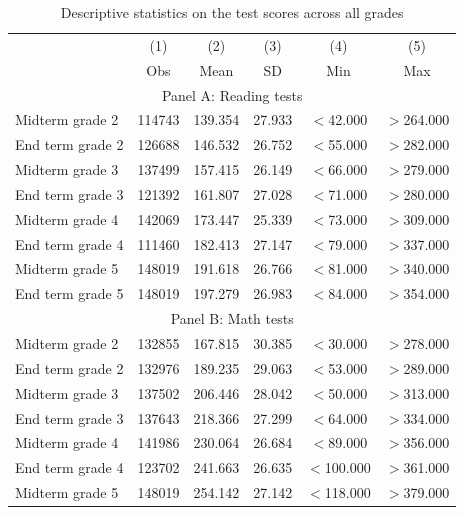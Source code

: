 \begin{table}[h!]
\begin{center}
\caption{Descriptive statistics on the test scores across all grades}
\label{tbl:descrstats_tests}
\begin{tabular}{lccccc}
\toprule \toprule
&\multicolumn{1}{c}{(1)}&\multicolumn{1}{c}{(2)}&\multicolumn{1}{c}{(3)}&\multicolumn{1}{c}{(4)}&\multicolumn{1}{c}{(5)}\\
& Obs & Mean & SD  & Min & Max  \\
\midrule
\multicolumn{6}{c}{Panel A: Reading tests} \\
Midterm grade 2     &      114743&     139.354&      27.933&      $<$42.000&     $>$264.000\\
End term grade 2    &      126688&     146.532&      26.752&      $<$55.000&     $>$282.000\\
Midterm grade 3     &      137499&     157.415&      26.149&      $<$66.000&     $>$279.000\\
End term grade 3    &      121392&     161.807&      27.028&      $<$71.000&    $>$280.000\\
Midterm grade 4     &      142069&     173.447&      25.339&      $<$73.000&     $>$309.000\\
End term grade 4    &      111460&     182.413&      27.147&      $<$79.000&    $>$337.000\\
Midterm grade 5     &      148019&     191.618&      26.766&      $<$81.000&    $>$340.000\\
End term grade 5    &      148019&     197.279&      26.983&      $<$84.000&     $>$354.000\\
[.25em]
\multicolumn{6}{c}{Panel B: Math tests} \\
Midterm grade 2     &      132855&     167.815&      30.385&      $<$30.000&     $>$278.000\\
End term grade 2    &      132976&     189.235&      29.063&      $<$53.000&     $>$289.000\\
Midterm grade 3     &      137502&     206.446&      28.042&      $<$50.000&     $>$313.000\\
End term grade 3    &      137643&     218.366&      27.299&      $<$64.000&    $>$334.000\\
Midterm grade 4     &      141986&     230.064&      26.684&      $<$89.000&     $>$356.000\\
End term grade 4    &      123702&     241.663&      26.635&      $<$100.000&     $>$361.000\\
Midterm grade 5     &      148019&     254.142&      27.142&      $<$118.000&     $>$379.000\\

\end{tabular}
\end{center}
\end{table}
